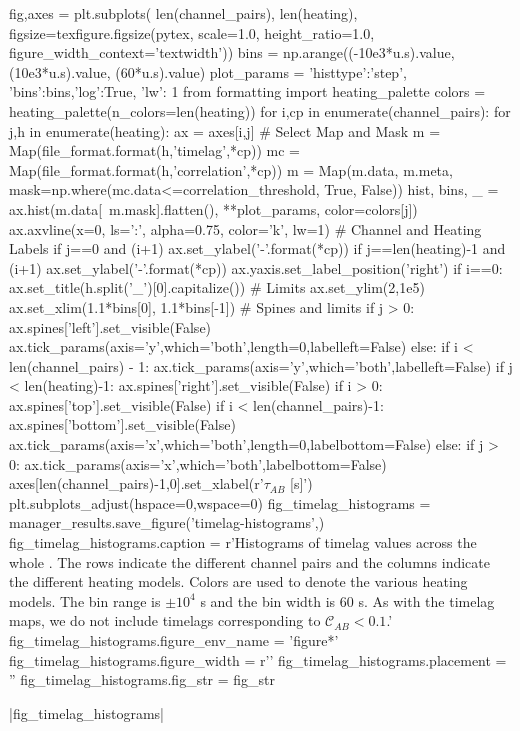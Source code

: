 \begin{pycode}
fig,axes = plt.subplots(
    len(channel_pairs), len(heating),
    figsize=texfigure.figsize(pytex, scale=1.0, height_ratio=1.0,
                              figure_width_context='textwidth'))
bins = np.arange((-10e3*u.s).value, (10e3*u.s).value, (60*u.s).value)
plot_params = {'histtype':'step', 'bins':bins,'log':True,
               'lw': 1}
from formatting import heating_palette
colors = heating_palette(n_colors=len(heating))
for i,cp in enumerate(channel_pairs):
    for j,h in enumerate(heating):
        ax = axes[i,j]
        # Select Map and Mask
        m = Map(file_format.format(h,'timelag',*cp))
        mc = Map(file_format.format(h,'correlation',*cp))
        m = Map(m.data, m.meta, mask=np.where(mc.data<=correlation_threshold, True, False))
        hist, bins, _ = ax.hist(m.data[~m.mask].flatten(), **plot_params, color=colors[j])
        ax.axvline(x=0, ls=':', alpha=0.75, color='k', lw=1)
        # Channel and Heating Labels
        if j==0 and (i+1)%
            ax.set_ylabel('{}-{}'.format(*cp))
        if j==len(heating)-1 and (i+1)%
            ax.set_ylabel('{}-{}'.format(*cp))
            ax.yaxis.set_label_position('right')
        if i==0:
            ax.set_title(h.split('_')[0].capitalize())
        # Limits
        ax.set_ylim(2,1e5)
        ax.set_xlim(1.1*bins[0], 1.1*bins[-1])
        # Spines and limits
        if j > 0:
            ax.spines['left'].set_visible(False)
            ax.tick_params(axis='y',which='both',length=0,labelleft=False)
        else:
            if i < len(channel_pairs) - 1:
                ax.tick_params(axis='y',which='both',labelleft=False)
        if j < len(heating)-1:
            ax.spines['right'].set_visible(False)
        if i > 0:
            ax.spines['top'].set_visible(False)
        if i < len(channel_pairs)-1:
            ax.spines['bottom'].set_visible(False)
            ax.tick_params(axis='x',which='both',length=0,labelbottom=False)
        else:
            if j > 0:
                ax.tick_params(axis='x',which='both',labelbottom=False)
axes[len(channel_pairs)-1,0].set_xlabel(r'$\tau_{AB}$ [s]')
plt.subplots_adjust(hspace=0,wspace=0)
fig_timelag_histograms = manager_results.save_figure('timelag-histograms',)
fig_timelag_histograms.caption = r'Histograms of timelag values across the whole \AR{}. The rows indicate the different channel pairs and the columns indicate the different heating models. Colors are used to denote the various heating models. The bin range is $\pm10^4$ s and the bin width is 60 s. As with the timelag maps, we do not include timelags corresponding to $\mathcal{C}_{AB}<0.1$.'
fig_timelag_histograms.figure_env_name = 'figure*'
fig_timelag_histograms.figure_width = r'\textwidth'
fig_timelag_histograms.placement = ''
fig_timelag_histograms.fig_str = fig_str
\end{pycode}
|fig_timelag_histograms|

